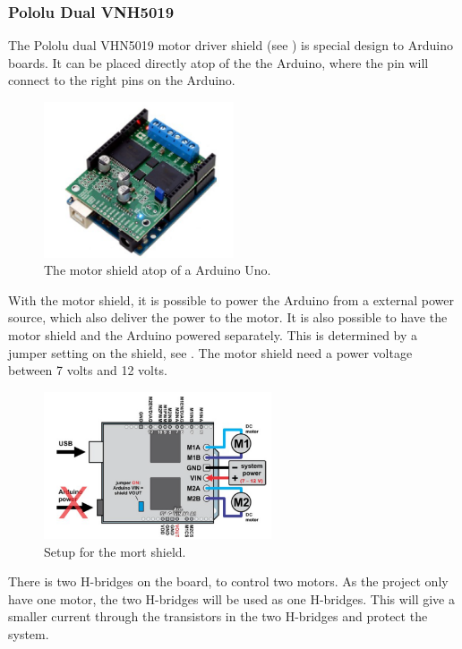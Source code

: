 \subsubsection{Pololu Dual VNH5019}
The Pololu dual VHN5019 motor driver shield (see ) is special design to Arduino boards. It can be placed directly atop of the the Arduino, where the pin will connect to the right pins on the Arduino. 

\begin{figure}[H]
	\centering
	\includegraphics[width=0.50\textwidth]{figures/Motordriver}
		\caption{The motor shield atop of a Arduino Uno.} 
	\label{MotorDrive}
\end{figure}

With the motor shield, it is possible to power the Arduino from a external power source, which also deliver the power to the motor. It is also possible to have the motor shield and the Arduino powered separately. This is determined by a jumper setting on the shield, see . The motor shield need a power voltage between 7 volts and 12 volts.

\begin{figure}[H]
	\centering
	\includegraphics[width=0.60\textwidth]{figures/MotordriverIO}
		\caption{Setup for the mort shield.}
	\label{MotorDriveIO}
\end{figure}

There is two H-bridges on the board, to control two motors. As the project only have one motor, the two H-bridges will be used as one H-bridges. This will give a smaller current through the transistors in the two H-bridges and protect the system.

